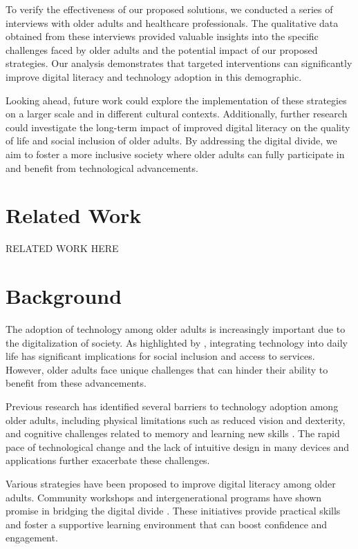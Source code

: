 \documentclass{article} %
\begin{document}
To verify the effectiveness of our proposed solutions, we conducted a series of interviews with older adults and healthcare professionals. The qualitative data obtained from these interviews provided valuable insights into the specific challenges faced by older adults and the potential impact of our proposed strategies. Our analysis demonstrates that targeted interventions can significantly improve digital literacy and technology adoption in this demographic.

Looking ahead, future work could explore the implementation of these strategies on a larger scale and in different cultural contexts. Additionally, further research could investigate the long-term impact of improved digital literacy on the quality of life and social inclusion of older adults. By addressing the digital divide, we aim to foster a more inclusive society where older adults can fully participate in and benefit from technological advancements.

\section{Related Work}
\label{sec:related}
RELATED WORK HERE

\section{Background}
\label{sec:background}

The adoption of technology among older adults is increasingly important due to the digitalization of society. As highlighted by \citet{park2023generative}, integrating technology into daily life has significant implications for social inclusion and access to services. However, older adults face unique challenges that can hinder their ability to benefit from these advancements.

Previous research has identified several barriers to technology adoption among older adults, including physical limitations such as reduced vision and dexterity, and cognitive challenges related to memory and learning new skills \citep{shanahan2023role}. The rapid pace of technological change and the lack of intuitive design in many devices and applications further exacerbate these challenges.

Various strategies have been proposed to improve digital literacy among older adults. Community workshops and intergenerational programs have shown promise in bridging the digital divide \citep{wang2023describe}. These initiatives provide practical skills and foster a supportive learning environment that can boost confidence and engagement.
\end{document}
